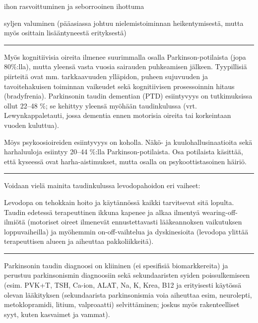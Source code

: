 \documentclass[
]{book}
\begin{document}
ihon rasvoittuminen ja seborrooinen ihottuma

syljen valuminen (pääasiassa johtuu nielemistoiminnan heikentymisestä, mutta myös osittain lisääntyneestä erityksestä)

\begin{center}\rule{0.5\linewidth}{0.5pt}\end{center}

Myös kognitiivisia oireita ilmenee suurimmalla osalla Parkinson-potilaista (jopa 80\%:lla), mutta yleensä vasta vuosia sairauden puhkeamisen jälkeen. Tyypillisiä piirteitä ovat mm. tarkkaavuuden ylläpidon, puheen sujuvuuden ja tavoitehakuisen toiminnan vaikeudet sekä kognitiivisen prosessoinnin hitaus (bradyfrenia). Parkinsonin taudin dementian (PTD) esiintyvyys on tutkimuksissa ollut 22--48 \%; se kehittyy yleensä myöhään taudinkulussa (vrt. Lewynkappaletauti, jossa dementia ennen motorisia oireita tai korkeintaan vuoden kuluttua).

Möys psykoosioireiden esiintyvyys on koholla. Näkö- ja kuulohallusinaatioita sekä harhaluuloja esiintyy 20--44 \%:lla Parkinson-potilaista. Osa potilaista käsittää, että kyseessä ovat harha-aistimukset, mutta osalla on psykoottistasoinen häiriö.

\begin{center}\rule{0.5\linewidth}{0.5pt}\end{center}

Voidaan vielä mainita taudinkulussa levodopahoidon eri vaiheet:

Levodopa on tehokkain hoito ja käytännössä kaikki tarvitsevat sitä lopulta. Taudin edetessä terapeuttinen ikkuna kapenee ja alkaa ilmentyä wearing-off-ilmiötä (motoriset oireet ilmenevät ennustettavasti lääkeannoksen vaikutuksen loppuvaiheilla) ja myöhemmin on-off-vaihtelua ja dyskinesioita (levodopa ylittää terapeuttisen alueen ja aiheuttaa pakkoliikkeitä).

\begin{center}\rule{0.5\linewidth}{0.5pt}\end{center}

Parkinsonin taudin diagnoosi on kliininen (ei spesifisiä biomarkkereita) ja perustuu parkinsonismin diagnoosiin sekä sekundaaristen syiden poissulkemiseen (esim. PVK+T, TSH, Ca-ion, ALAT, Na, K, Krea, B12 ja erityisesti käytössä olevan lääkityksen (sekundaarista parkinsonismia voia aiheuttaa esim, neurolepti, metoklopramidi, litium, valproaatti) selvittäminen; joskus myös rakenteelliset syyt, kuten kasvaimet ja vammat).
\end{document}
